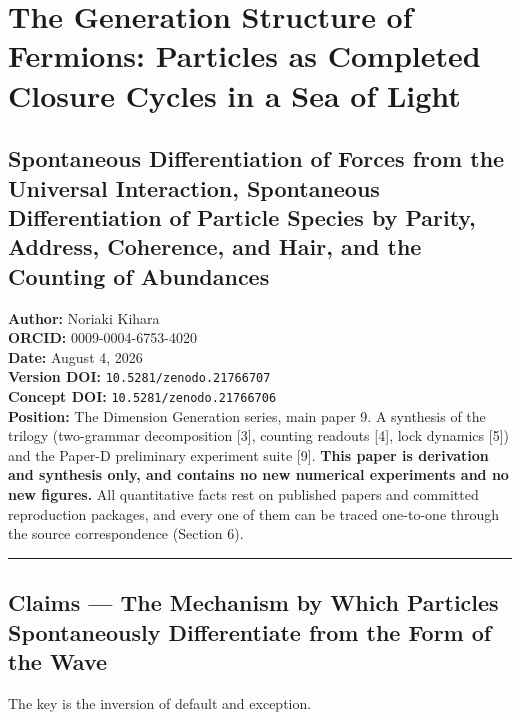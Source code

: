 \documentclass[
  a4paper,
]{article}
\author{}
\date{}
\begin{document}
\section{The Generation Structure of Fermions: Particles as Completed
Closure Cycles in a Sea of
Light}\label{the-generation-structure-of-fermions-particles-as-completed-closure-cycles-in-a-sea-of-light}

\subsection{Spontaneous Differentiation of Forces from the Universal
Interaction, Spontaneous Differentiation of Particle Species by Parity,
Address, Coherence, and Hair, and the Counting of
Abundances}\label{spontaneous-differentiation-of-forces-from-the-universal-interaction-spontaneous-differentiation-of-particle-species-by-parity-address-coherence-and-hair-and-the-counting-of-abundances}

\textbf{Author:} Noriaki Kihara\\
\textbf{ORCID:} 0009-0004-6753-4020\\
\textbf{Date:} August 4, 2026\\
\textbf{Version DOI:} \texttt{10.5281/zenodo.21766707}\\
\textbf{Concept DOI:} \texttt{10.5281/zenodo.21766706}\\
\textbf{Position:} The Dimension Generation series, main paper 9. A
synthesis of the trilogy (two-grammar decomposition {[}3{]}, counting
readouts {[}4{]}, lock dynamics {[}5{]}) and the Paper-D preliminary
experiment suite {[}9{]}. \textbf{This paper is derivation and synthesis
only, and contains no new numerical experiments and no new figures.} All
quantitative facts rest on published papers and committed reproduction
packages, and every one of them can be traced one-to-one through the
source correspondence (Section 6).

\begin{center}\rule{0.5\linewidth}{0.5pt}\end{center}

\subsection{Claims --- The Mechanism by Which Particles Spontaneously
Differentiate from the Form of the
Wave}\label{claims-the-mechanism-by-which-particles-spontaneously-differentiate-from-the-form-of-the-wave}

The key is the inversion of default and exception.
\end{document}

